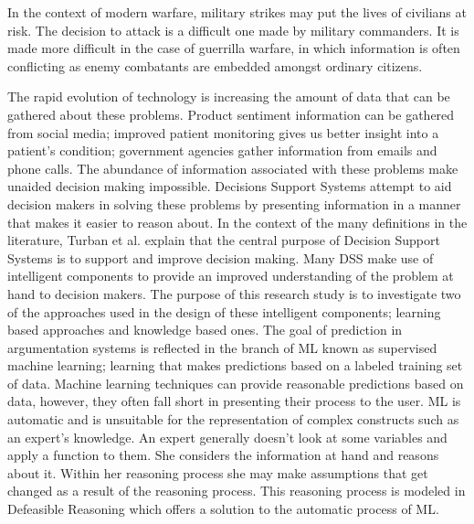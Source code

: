 In the context of modern warfare, military strikes may put the lives of civilians at risk. The decision to attack is a difficult one made by military commanders. It is made more difficult in the case of guerrilla warfare, in which information is often conflicting as enemy combatants are embedded amongst ordinary citizens.

The rapid evolution of technology is increasing the amount of data that can be gathered about these problems. Product sentiment information can be gathered from social media; improved patient monitoring gives us better insight into a patient’s condition; government agencies gather information from emails and phone calls. The abundance of information associated with these problems make unaided decision making impossible. Decisions Support Systems attempt to aid decision makers in solving these problems by presenting information in a manner that makes it easier to reason about.
In the context of the many definitions in the literature, Turban et al.\cite{turban2005decision} explain that the central purpose of Decision Support Systems is to support and improve decision making. Many DSS make use of intelligent components to provide an improved understanding of the problem at hand to decision makers. The purpose of this research study is to investigate two of the approaches used in the design of these intelligent components; learning based approaches and knowledge based ones.
The goal of prediction in argumentation systems is reflected in the branch of ML known as supervised machine learning; learning that makes predictions based on a labeled training set of data. Machine learning techniques can provide reasonable predictions based on data, however, they often fall short in presenting their process to the user. ML is automatic and is unsuitable for the representation of complex constructs such as an expert's knowledge.
An expert generally doesn't look at some variables and apply a function to them. She considers the information at hand and reasons about it. Within her reasoning process she may make assumptions that get changed as a result of the reasoning process. This reasoning process is modeled in Defeasible Reasoning which offers a solution to the automatic process of ML.




